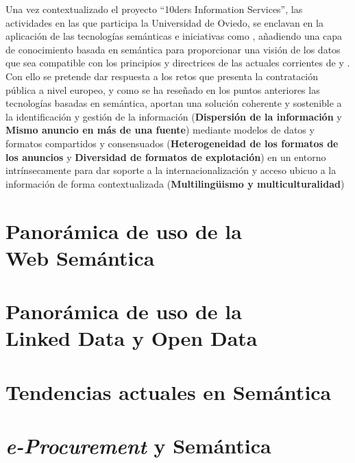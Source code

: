 \documentclass[a4paper,twoside,12pt]{report}
\begin{document}
Una vez contextualizado el proyecto ``10ders Information Services'', las actividades en las que 
participa la Universidad de Oviedo, se enclavan en la aplicación de las tecnologías semánticas
e iniciativas como \linkeddata, añadiendo una capa de conocimiento basada en semántica para proporcionar
una visión de los datos que sea compatible con los principios y directrices de las 
actuales corrientes de \opendata y \linkeddata. Con ello se pretende dar respuesta a los retos
que presenta la contratación pública a nivel europeo, y como se ha reseñado en los puntos anteriores las tecnologías
basadas en semántica, aportan una solución coherente y sostenible a la identificación y gestión de la información 
(\textbf{Dispersión de la información} y \textbf{Mismo anuncio en más de una fuente}) mediante modelos de datos y formatos
compartidos y consensuados (\textbf{Heterogeneidad de los formatos de los anuncios} y \textbf{Diversidad de formatos de explotación}) en un entorno
intrínsecamente para dar soporte a la internacionalización y acceso ubicuo a la información de forma
contextualizada (\textbf{Multilingüismo y multiculturalidad})

\chapter{\label{capitulo:semantica}Panorámica de uso de la\\ Web Semántica} 

\chapter{\label{capitulo:semantica}Panorámica de uso de la\\ Linked Data y Open Data} 

\chapter{\label{capitulo:eproc-sm}Tendencias actuales en Semántica} 

\chapter{\label{capitulo:eproc-sm}\textit{e-Procurement} y Semántica} 


\printindex
\printglossaries


\insertbibliography
\end{document}
